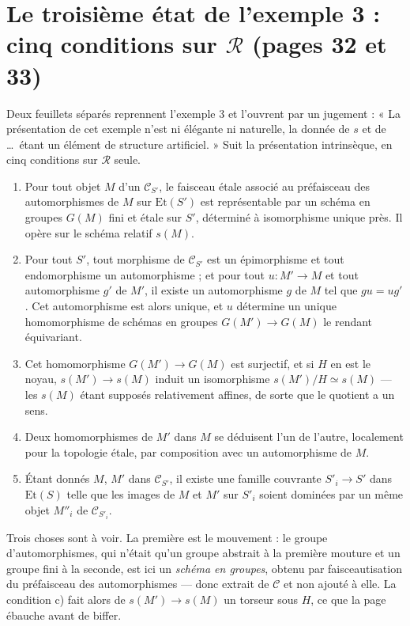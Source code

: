 \documentclass[11pt,a4paper]{article}
\begin{document}
\section*{Le troisième état de l'exemple 3 : cinq conditions sur $\mathcal{R}$ (pages 32 et 33)}

Deux feuillets séparés reprennent l'exemple 3 et l'ouvrent par un jugement :
« La présentation de cet exemple n'est ni élégante ni naturelle, la donnée de
$s$ et de \dots\ étant un élément de structure artificiel. » Suit la
présentation intrinsèque, en cinq conditions sur $\mathcal{R}$ seule.

\begin{enumerate}
  \item[a)] Pour tout objet $M$ d'un $\mathcal{C}_{S'}$, le faisceau étale
    associé au préfaisceau des automorphismes de $M$ sur $\mathrm{Et}(S')$ est
    représentable par un schéma en groupes $G(M)$ fini et étale sur $S'$,
    déterminé à isomorphisme unique près. Il opère sur le schéma relatif
    $s(M)$.
  \item[b)] Pour tout $S'$, tout morphisme de $\mathcal{C}_{S'}$ est un
    épimorphisme et tout endomorphisme un automorphisme ; et pour tout
    $u : M' \to M$ et tout automorphisme $g'$ de $M'$, il existe un
    automorphisme $g$ de $M$ tel que $gu = ug'$. Cet automorphisme est alors
    unique, et $u$ détermine un unique homomorphisme de schémas en groupes
    $G(M') \to G(M)$ le rendant équivariant.
  \item[c)] Cet homomorphisme $G(M') \to G(M)$ est surjectif, et si $H$ en est
    le noyau, $s(M') \to s(M)$ induit un isomorphisme $s(M')/H \simeq s(M)$ ---
    les $s(M)$ étant supposés relativement affines, de sorte que le quotient a
    un sens.
  \item[d)] Deux homomorphismes de $M'$ dans $M$ se déduisent l'un de l'autre,
    localement pour la topologie étale, par composition avec un automorphisme
    de $M$.
  \item[e)] Étant donnés $M$, $M'$ dans $\mathcal{C}_{S'}$, il existe une
    famille couvrante $S'_{i} \to S'$ dans $\mathrm{Et}(S)$ telle que les
    images de $M$ et $M'$ sur $S'_{i}$ soient dominées par un même objet
    $M''_{i}$ de $\mathcal{C}_{S'_{i}}$.
\end{enumerate}

Trois choses sont à voir. La première est le mouvement : le groupe
d'automorphismes, qui n'était qu'un groupe abstrait à la première mouture et un
groupe fini à la seconde, est ici un \emph{schéma en groupes}, obtenu par
faisceautisation du préfaisceau des automorphismes --- donc extrait de
$\mathcal{C}$ et non ajouté à elle. La condition c) fait alors de $s(M') \to
s(M)$ un torseur sous $H$, ce que la page ébauche avant de biffer.
\end{document}
